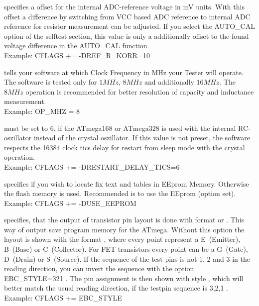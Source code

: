 \begin{description} \setlength{\itemsep}{0em}

  \item[REF\_R\_KORR] specifies a offset for the internal ADC-reference voltage in mV units.
With this offset a difference by switching from VCC based ADC reference to internal ADC reference for resistor measurement can be adjusted.
If you select the AUTO\_CAL option of the selftest section, this value is only a additionally offset to the found voltage 
difference in the AUTO\_CAL function.\\
Example: CFLAGS += -DREF\_R\_KORR=10

  \item[OP\_MHZ] tells your software at which Clock Frequency in MHz your Tester will operate.
The software is tested only for \(1MHz\), \(8MHz\) and additionally \(16MHz\). 
The \(8MHz\) operation is recommended for better resolution of capacity and inductance measurement.\\
Example: OP\_MHZ = 8

  \item[RESTART\_DELAY\_TICS] must be set to 6, if the ATmega168 or ATmega328 is used with the internal RC-oszillator instead of
the crystal oszillator.
If this value is not preset, the software respects the 16384 clock tics delay for restart from sleep mode with the crystal operation.\\
Example: CFLAGS += -DRESTART\_DELAY\_TICS=6

  \item[USE\_EEPROM] specifies if you wish to locate fix text and tables in EEprom Memory. Otherwise the flash memory is used.
Recommended is to use the EEprom (option set).\\
Example: CFLAGS += -DUSE\_EEPROM

\item[EBC\_STYLE] specifies, that the output of transistor pin layout is done with format  or .
This way of output save program memory for the ATmega. Without this option the layout is shown with the
format , where every point represent a E~(Emitter), B~(Base) or C~(Collector).
For FET transistors every point can be a G~(Gate), D~(Drain) or S~(Source).
If the sequence of the test pins is not 1, 2 and 3 in the reading direction, you can invert the sequence with the option
EBC\_STYLE=321 . The pin assignment is then shown with style , which will better match the usual
reading direction, if the testpin sequence is 3,2,1 .\\
Example: CFLAGS += EBC\_STYLE


\end{description}
